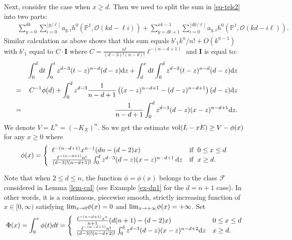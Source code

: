 \documentclass[12pt]{amsart}
\theoremstyle{definition}
\def\lim{{\rm lim}}
\def\dif{{\rm d}}
\def\vol{{\rm vol}}
\newcommand{\IP}{{\mathbb P}}
\newcommand{\CO}{{\mathcal O}}
\newcommand{\gee}{\geqslant}
\begin{document}
Next, consider the case when $x\gee d$. Then we need to split the sum in \eqref{eq-tels2} into two parts:
\begin{eqnarray*}
    &&\sum_{y=0}^{dk}\sum_{i=0}^{\lfloor y/\ell\rfloor} a_{y,i}h^0(\IP^1, \CO(kd-\ell i))+\sum_{y=dk+1}^{xk-1}\sum_{i=0}^{\lfloor dk/\ell \rfloor}a_{y,i}h^0(\IP^1, \CO(kd-i\ell)).
\end{eqnarray*}
Similar calculation as above shows that this sum equals $b'_1 k^n/n!+O(k^{n-1})$ with $b'_1$ equal to $C\cdot \mathbf{I}$ where $C= \frac{n!}{(d-3)!(n-d)!}\ell^{-(n-d+1)}$ and $\mathbf{I}$ is equal to:
\begin{eqnarray*}
    &&\int_0^d \dif t\int_0^t z^{d-3}(t-z)^{n-d}(d-z)\dif z+\int_d^x \dif t\int_0^d z^{d-3}(t-z)^{n-d}(d-z)\dif z\\
    &=& C^{-1}\phi(d)+\int_0^d z^{d-3} \frac{1}{n-d+1}\left((x-z)^{n-d+1}-(d-z)^{n-d+1}\right)(d-z)\dif z\\
    &=&\frac{1}{n-d+1}\int_0^d z^{d-3}(d-z)(x-z)^{n-d+1}\dif z.
\end{eqnarray*}
We denote $V=L^n=(-K_X)^n$. So we get the estimate $\vol(L-xE)\ge V-\phi(x)$ for any $x\ge 0$ where
\begin{equation}\label{eq-phix}
   \phi(x)=
   \left\{\begin{array}{ll}
     \ell^{-(n-d+1)} x^{n-1} (dn-(d-2)x) &  \text{if }\; 0\le x\le d\\
    \frac{\ell^{-(n-d+1)} n!}{(d-3)!(n-d+1)!}\int_0^d z^{d-3}(d-z)(x-z)^{n-d+1}\, \dif z & \text{if }\; x\ge d.
\end{array}
\right.
\end{equation}

Note that when $2\le d\le n$, the function $\phi=\phi(x)$ belongs to the class $\mathscr{F}$ considered in Lemma \ref{lem-cal} (see Example \ref{ex-dn1} for the $d=n+1$ case).  In other words, it is a continuous, piecewise smooth, strictly increasing function of $x\in [0, \infty)$ satisfying $\lim_{x\rightarrow 0}\phi(x)=0$ and $\lim_{x\rightarrow+\infty}\phi(x)=+\infty$. Set
\begin{eqnarray}\label{eq-Phix}
\Phi(x)=\int_0^x \phi(t)dt=
\left\{
\begin{array}{ll}
    \frac{\ell^{-(n-d+1)}x^n}{n+1}(d(n+1)-(d-2)x) & 0\le x\le d \\
    \frac{\ell^{-(n-d+1)}n!}{(d-3)!(n-d+2)!}\int_0^\dif z^{d-3}(d-z)(x-z)^{n-d+2}\dif z & x\ge d. 
\end{array}
\right.
\end{eqnarray}
\end{document}
